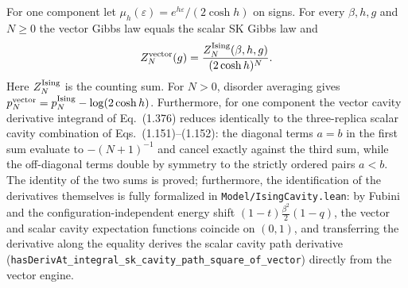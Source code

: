 \begin{theorem}\label{thm:sg-tal:vector-ising}
\leanok
For one component let $\mu_h(\varepsilon)=e^{h\varepsilon}/(2\cosh h)$ on signs.
For every $\beta,h,g$ and $N\ge0$ the vector Gibbs law equals the scalar SK Gibbs law and
\[
 Z_N^{\rm vector}(g)=\frac{Z_N^{\rm Ising}(\beta,h,g)}{(2\cosh h)^N}.
\]
Here $Z_N^{\rm Ising}$ is the counting sum. For $N>0$, disorder averaging gives
$p_N^{\rm vector}=p_N^{\rm Ising}-\log(2\cosh h)$.
Furthermore, for one component the vector cavity derivative integrand of Eq.~(1.376)
reduces identically to the three-replica scalar cavity combination of Eqs.~(1.151)--(1.152):
the diagonal terms $a = b$ in the first sum evaluate to $-(N+1)^{-1}$ and cancel exactly
against the third sum, while the off-diagonal terms double by symmetry to the strictly
ordered pairs $a < b$. The identity of the two sums is proved; furthermore, the identification
of the derivatives themselves is fully formalized in \texttt{Model/IsingCavity.lean}: by Fubini
and the configuration-independent energy shift $(1-t)\frac{\beta^2}{2}(1-q)$, the vector and scalar
cavity expectation functions coincide on $(0, 1)$, and transferring the derivative along the
equality derives the scalar cavity path derivative
(\texttt{hasDerivAt\_integral\_sk\_cavity\_path\_square\_of\_vector}) directly from the vector engine.
\end{theorem}
